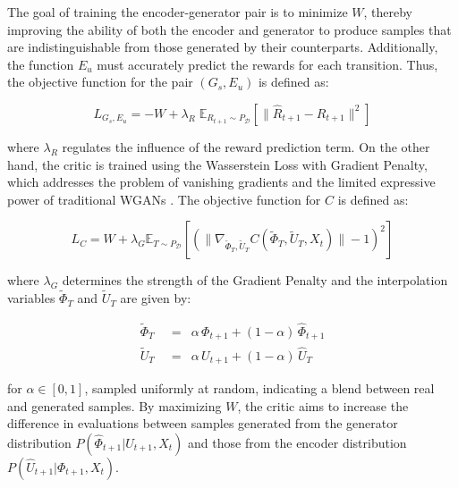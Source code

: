 The goal of training the encoder-generator pair is to minimize \( W \),
thereby improving the ability of both the encoder and generator
to produce samples that are indistinguishable from those generated
by their counterparts. Additionally, the function \( E_u \) must
accurately predict the rewards for each transition.
Thus, the objective function for the pair \( (G_s, E_u) \) is defined as:

\begin{equation}
L_{G_s, E_u} = -W + \lambda_R \; \mathbb{E}_{R_{t+1} \sim P_{\mathcal{D}}}
\left[ \| \hat{R}_{t+1} - R_{t+1} \|^2 \right]
\end{equation}

where \( \lambda_R \) regulates the influence of the reward
prediction term. On the other hand, the critic is trained
using the Wasserstein Loss with Gradient Penalty,
which addresses the problem of vanishing gradients and
the limited expressive power of traditional WGANs \cite{gulrajani2017}.
The objective function for \( C \) is defined as:

\begin{equation}
L_C = W + \lambda_G \mathbb{E}_{T \sim P_{\mathcal{D}}}
\left[ (\| \nabla_{\tilde{\Phi}_T, \tilde{U}_T} C(\tilde{\Phi}_T,
\tilde{U}_T, X_t) \| - 1)^2 \right]
\end{equation}

where \( \lambda_G \) determines the strength of the Gradient Penalty
and the interpolation variables \( \tilde{\Phi}_T \) and \( \tilde{U}_T \)
are given by:

\[
    \begin{aligned}
        \tilde{\Phi}_T \;\; &=& \alpha \, \Phi_{t+1} + (1 - \alpha) \, \hat{\Phi}_{t+1} \\ 
        \tilde{U}_T \;\; &=& \alpha \, U_{t+1} + (1 - \alpha) \, \hat{U}_T
    \end{aligned}
\]

for \( \alpha \in [0, 1] \), sampled uniformly at random,
indicating a blend between real and generated samples.
By maximizing \( W \), the critic aims to increase the difference
in evaluations between samples generated from the generator distribution
\( P(\hat{\Phi}_{t+1} | U_{t+1}, X_t) \) and those from the encoder
distribution \( P(\hat{U}_{t+1} | \Phi_{t+1}, X_t) \).


